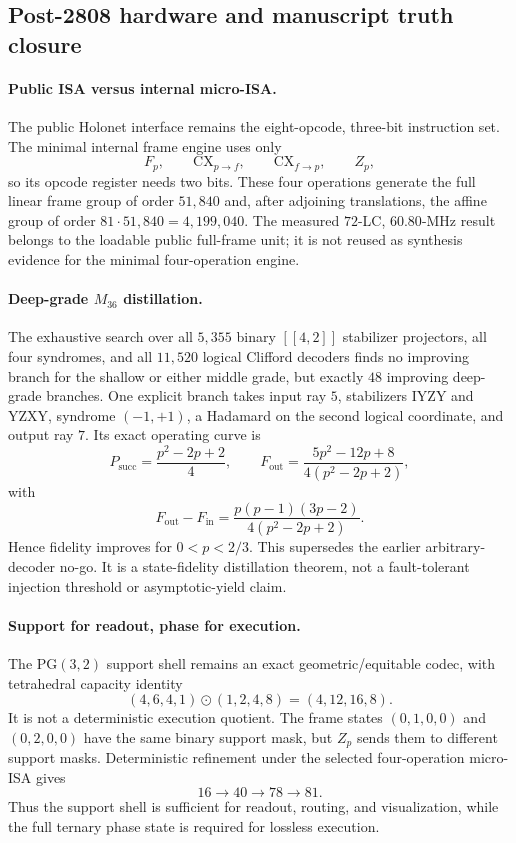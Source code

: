 \subsection{Post-2808 hardware and manuscript truth closure}
\label{sec:bt2820-bt2824-blueprint-hardening}

\paragraph{Public ISA versus internal micro-ISA.}
The public Holonet interface remains the eight-opcode, three-bit instruction set.  The
minimal internal frame engine uses only
\[
 F_p,\qquad \mathrm{CX}_{p\rightarrow f},\qquad
 \mathrm{CX}_{f\rightarrow p},\qquad Z_p,
\]
so its opcode register needs two bits.  These four operations generate the full linear
frame group of order $51{,}840$ and, after adjoining translations, the affine group of
order $81\cdot51{,}840=4{,}199{,}040$.  The measured $72$-LC, $60.80$-MHz result belongs
to the loadable public full-frame unit; it is not reused as synthesis evidence for the
minimal four-operation engine.

\paragraph{Deep-grade $M_{36}$ distillation.}
The exhaustive search over all $5{,}355$ binary $[[4,2]]$ stabilizer projectors, all four
syndromes, and all $11{,}520$ logical Clifford decoders finds no improving branch for the
shallow or either middle grade, but exactly $48$ improving deep-grade branches.  One
explicit branch takes input ray $5$, stabilizers
$\mathrm{IYZY}$ and $\mathrm{YZXY}$, syndrome $(-1,+1)$, a Hadamard on the second
logical coordinate, and output ray $7$.  Its exact operating curve is
\[
 P_{\mathrm{succ}}=\frac{p^2-2p+2}{4},\qquad
 F_{\mathrm{out}}=\frac{5p^2-12p+8}{4(p^2-2p+2)},
\]
with
\[
 F_{\mathrm{out}}-F_{\mathrm{in}}
 =\frac{p(p-1)(3p-2)}{4(p^2-2p+2)}.
\]
Hence fidelity improves for $0<p<2/3$.  This supersedes the earlier arbitrary-decoder
no-go.  It is a state-fidelity distillation theorem, not a fault-tolerant injection
threshold or asymptotic-yield claim.

\paragraph{Support for readout, phase for execution.}
The PG$(3,2)$ support shell remains an exact geometric/equitable codec, with tetrahedral
capacity identity
\[
 (4,6,4,1)\odot(1,2,4,8)=(4,12,16,8).
\]
It is not a deterministic execution quotient.  The frame states $(0,1,0,0)$ and
$(0,2,0,0)$ have the same binary support mask, but $Z_p$ sends them to different support
masks.  Deterministic refinement under the selected four-operation micro-ISA gives
\[
 \boxed{16\longrightarrow40\longrightarrow78\longrightarrow81}.
\]
Thus the support shell is sufficient for readout, routing, and visualization, while the
full ternary phase state is required for lossless execution.

